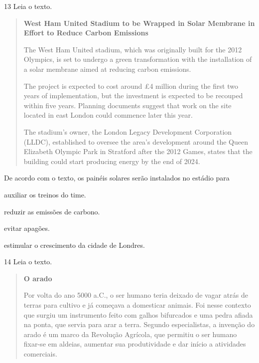 \num{13} Leia o texto.

\begin{quote}
\textbf{West Ham United Stadium to be Wrapped in Solar Membrane in
Effort to Reduce Carbon Emissions}

The West Ham United stadium, which was originally built for the 2012
Olympics, is set to undergo a green transformation with the installation
of a solar membrane aimed at reducing carbon emissions.

The project is expected to cost around £4 million during the first two
years of implementation, but the investment is expected to be recouped
within five years. Planning documents suggest that work on the site
located in east London could commence later this year.

The stadium's owner, the London Legacy Development Corporation (LLDC),
established to oversee the area's development around the Queen Elizabeth
Olympic Park in Stratford after the 2012 Games, states that the building
could start producing energy by the end of 2024.

\end{quote}

De acordo com o texto, os painéis solares serão instalados no estádio
para

\begin{escolha}
\item auxiliar os treinos do time.

\item reduzir as emissões de carbono.

\item evitar apagões.

\item estimular o crescimento da cidade de Londres.
\end{escolha}

\num{14} Leia o texto.

\begin{quote}
\textbf{O arado}

Por volta do ano 5000 a.C., o ser humano
teria deixado de vagar atrás de terras
para cultivo e já começava a domesticar
animais. Foi nesse contexto que surgiu um
instrumento feito com galhos bifurcados e
uma pedra afiada na ponta, que servia
para arar a terra. Segundo especialistas,
a invenção do arado é um marco da Revolução Agrícola, que permitiu o ser humano fixar-se em aldeias, aumentar sua produtividade e dar início a atividades comerciais.

\end{quote}


